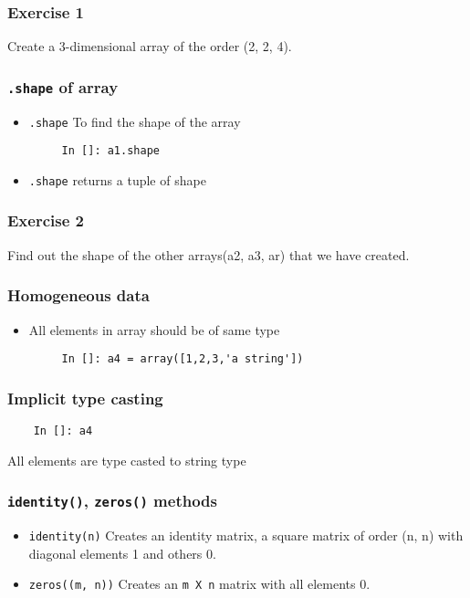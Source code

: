 \documentclass[presentation]{beamer}
\begin{document}
\begin{frame}
\frametitle{Exercise 1}
\label{sec-6}

  Create a 3-dimensional array of the order (2, 2, 4).
\end{frame}
\begin{frame}[fragile]
\frametitle{\texttt{.shape} of array}
\label{sec-7}

\begin{itemize}
\item \texttt{.shape}
    To find the shape of the array
\begin{verbatim}
     In []: a1.shape
\end{verbatim}

\item \texttt{.shape}
    returns a tuple of shape
\end{itemize}
\end{frame}
\begin{frame}
\frametitle{Exercise 2}
\label{sec-8}

  Find out the shape of the other arrays(a2, a3, ar) that we have created.
\end{frame}
\begin{frame}[fragile]
\frametitle{Homogeneous data}
\label{sec-9}

\begin{itemize}
\item All elements in array should be of same type
\begin{verbatim}
     In []: a4 = array([1,2,3,'a string'])
\end{verbatim}

\end{itemize}
\end{frame}
\begin{frame}[fragile]
\frametitle{Implicit type casting}
\label{sec-10}

\begin{verbatim}
    In []: a4
\end{verbatim}

    All elements are type casted to string type
\end{frame}
\begin{frame}
\frametitle{\texttt{identity()}, \texttt{zeros()} methods}
\label{sec-11}

\begin{itemize}
\item \texttt{identity(n)}
    Creates an identity matrix, a square matrix of order (n, n) with diagonal elements 1 and others 0.
\item \texttt{zeros((m, n))}
    Creates an \texttt{m X n} matrix with all elements 0.
\end{itemize}
\end{frame}
\end{document}
